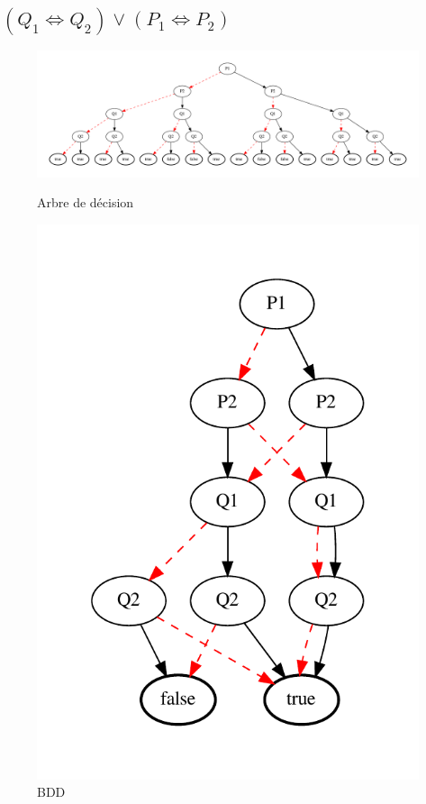 \documentclass[a4paper,11pt]{article}
\begin{document}
\subsection*{$(Q_1 \Leftrightarrow Q_2) \lor (P_1 \Leftrightarrow P_2)$}
\begin{figure}[!htb]
  \begin{minipage}{1\textwidth}
    \centering
    \includegraphics[width=0.8\linewidth]{tests_rapport/test1_dectree.pdf}
    \caption*{Arbre de décision}
  \end{minipage}
  \begin{minipage}{0.25\textwidth}
    \centering
    \includegraphics[width=0.8\linewidth]{tests_rapport/test1_bdd.pdf}
    \caption*{BDD}
  \end{minipage}\hfill

\end{figure}
\end{document}
